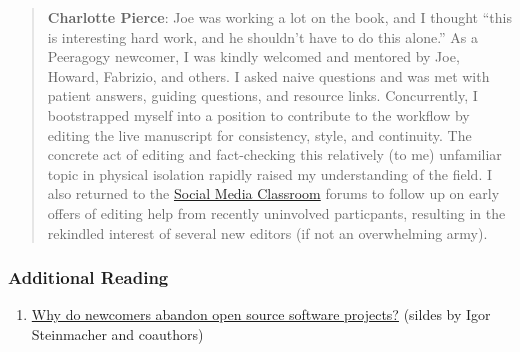 \begin{quote}
\textbf{Charlotte Pierce}: Joe was
working a lot on the book, and I thought ``this is interesting hard
work, and he shouldn't have to do this alone.'' As a Peeragogy newcomer,
I was kindly welcomed and mentored by Joe, Howard, Fabrizio, and others.
I asked naive questions and was met with patient answers, guiding
questions, and resource links. Concurrently, I bootstrapped myself into
a position to contribute to the workflow by editing the live manuscript
for consistency, style, and continuity. The concrete act of editing and
fact-checking this relatively (to me) unfamiliar topic in physical
isolation rapidly raised my understanding of the field. I also returned
to the \href{http://socialmediaclassroom.com/host/peeragogy}{Social
Media Classroom} forums to follow up on early offers of editing help
from recently uninvolved particpants, resulting in the rekindled
interest of several new editors (if not an overwhelming army).
\end{quote}

\subsubsection{Additional Reading}

\begin{enumerate}
\item
  \href{http://lapessc.ime.usp.br/public/papers/13872/CHASE13\_present.pdf}{Why
  do newcomers abandon open source software projects?} (sildes by Igor
  Steinmacher and coauthors)
\end{enumerate}
